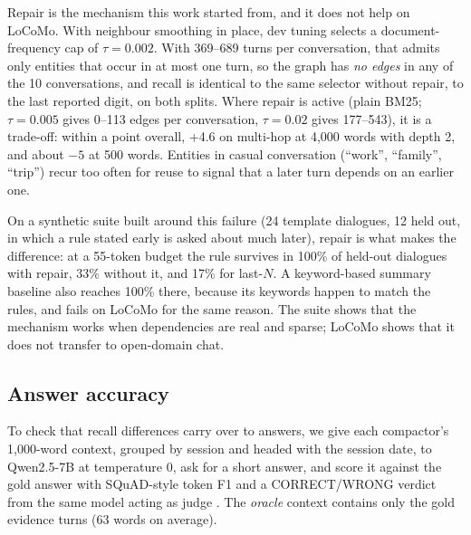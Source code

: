 \documentclass[11pt]{article}
\begin{document}
Repair is the mechanism this work started from, and it does not help on LoCoMo. With neighbour
smoothing in place, dev tuning selects a document-frequency cap of $\tau=0.002$. With 369--689
turns per conversation, that admits only entities that occur in at most one turn, so the graph
has \emph{no edges} in any of the 10 conversations, and recall is identical to the same selector
without repair, to the last reported digit, on both splits. Where repair is active
(plain BM25; $\tau=0.005$ gives 0--113 edges per conversation, $\tau=0.02$ gives 177--543), it is
a trade-off: within a point overall, +4.6 on multi-hop at 4,000 words with depth 2, and about
$-5$ at 500 words. Entities in casual conversation (``work'', ``family'', ``trip'') recur too
often for reuse to signal that a later turn depends on an earlier one.

On a synthetic suite built around this failure (24 template dialogues, 12 held out, in which a
rule stated early is asked about much later), repair is what makes the difference: at a
55-token budget the rule survives in 100\% of held-out dialogues with repair, 33\% without it,
and 17\% for last-$N$. A keyword-based summary baseline also reaches 100\% there, because its
keywords happen to match the rules, and fails on LoCoMo for the same reason. The suite shows
that the mechanism works when dependencies are real and sparse; LoCoMo shows that it does not
transfer to open-domain chat.

\subsection{Answer accuracy}

To check that recall differences carry over to answers, we give each compactor's 1,000-word
context, grouped by session and headed with the session date, to Qwen2.5-7B
\citep{qwen2024qwen25} at temperature 0, ask for a short answer, and score it against the gold
answer with SQuAD-style token F1 \citep{rajpurkar2016squad} and a CORRECT/WRONG verdict from the
same model acting as judge \citep{zheng2023judge}. The \emph{oracle} context contains only the
gold evidence turns (63 words on average).
\end{document}
